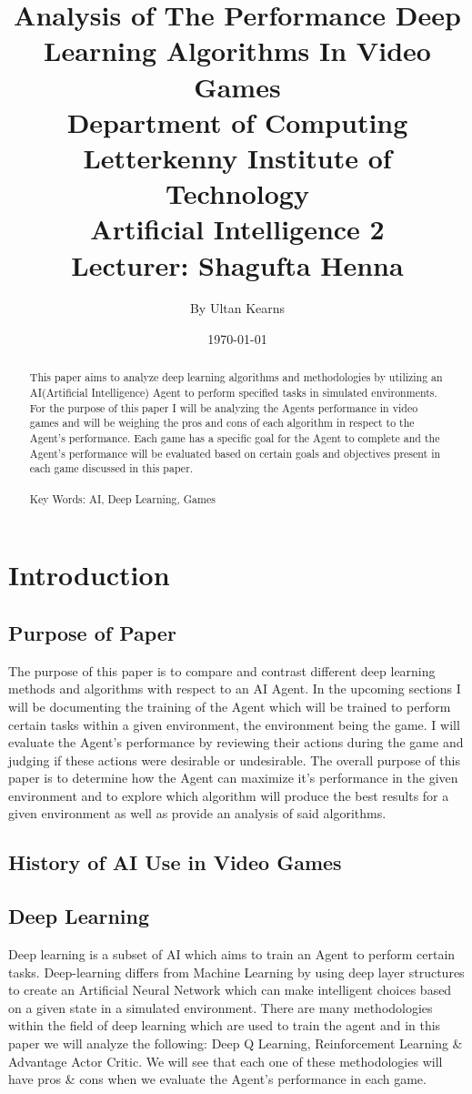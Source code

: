 \documentclass[conference]{IEEEtran}
\title{
Analysis of The Performance Deep Learning Algorithms In Video Games\\
\vspace{5mm}
\large Department of Computing \\
\vspace{3mm} 
\large Letterkenny Institute of Technology \\
\vspace{3mm} 
\large Artificial Intelligence 2 \\
\vspace{3mm} 
\large Lecturer: Shagufta Henna
}
\author{By Ultan Kearns}
\date{\today}
\begin{document}
\maketitle
\begin{abstract}
    This paper aims to analyze deep learning algorithms and methodologies by utilizing an AI(Artificial Intelligence) Agent to perform specified tasks in simulated environments.  For the purpose of this paper I will be analyzing the Agents performance in video games and will be weighing the pros and cons of each algorithm in respect to the Agent's performance.  Each game has a specific goal for the Agent to complete and the Agent's performance will be evaluated based on certain goals and objectives present in each game discussed in this paper. 
    \\
    \\
    Key Words: AI, Deep Learning, Games
\end{abstract}
\section{Introduction}
\subsection{Purpose of Paper}
The purpose of this paper is to compare and contrast different deep learning methods and algorithms with respect to an AI Agent.  In the upcoming sections I will be documenting the training of the Agent which will be trained to perform certain tasks within a given environment, the environment being the game.  I will evaluate the Agent's performance by reviewing their actions during the game and judging if these actions were desirable or undesirable.  The overall purpose of this paper is to determine how the Agent can maximize it's performance in the given environment and to explore which algorithm will produce the best results for a given environment as well as provide an analysis of said algorithms.
\subsection{History of AI Use in Video Games}

\subsection{Deep Learning}
Deep learning is a subset of AI which aims to train an Agent to perform certain tasks.  Deep-learning differs from Machine Learning by using deep layer structures to create an Artificial Neural Network which can make intelligent choices based on a given state in a simulated environment.  There are many methodologies within the field of deep learning which are used to train the agent and in this paper we will analyze the following: Deep Q Learning, Reinforcement Learning \& Advantage Actor Critic.  We will see that each one of these methodologies will have pros \& cons when we evaluate the Agent's performance in each game.
\end{document}
